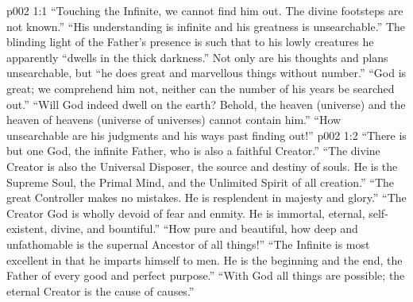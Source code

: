 \vs p002 1:1 “Touching the Infinite, we cannot find him out. The divine footsteps are not known.” “His understanding is infinite and his greatness is unsearchable.” The blinding light of the Father’s presence is such that to his lowly creatures he apparently “dwells in the thick darkness.” Not only are his thoughts and plans unsearchable, but “he does great and marvellous things without number.” “God is great; we comprehend him not, neither can the number of his years be searched out.” “Will God indeed dwell on the earth? Behold, the heaven (universe) and the heaven of heavens (universe of universes) cannot contain him.” “How unsearchable are his judgments and his ways past finding out!”
\vs p002 1:2 “There is but one God, the infinite Father, who is also a faithful Creator.” “The divine Creator is also the Universal Disposer, the source and destiny of souls. He is the Supreme Soul, the Primal Mind, and the Unlimited Spirit of all creation.” “The great Controller makes no mistakes. He is resplendent in majesty and glory.” “The Creator God is wholly devoid of fear and enmity. He is immortal, eternal, self\hyp{}existent, divine, and bountiful.” “How pure and beautiful, how deep and unfathomable is the supernal Ancestor of all things!” “The Infinite is most excellent in that he imparts himself to men. He is the beginning and the end, the Father of every good and perfect purpose.” “With God all things are possible; the eternal Creator is the cause of causes.”
